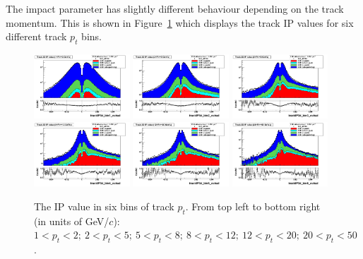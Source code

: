 The impact parameter has slightly different behaviour depending on the track momentum. This is shown in Figure~\ref{fig:IPbinnedTrackpt} which displays the track IP values for six different track $p_t$ bins.  




\begin{figure}[h!]
\centering
\includegraphics[width=0.32\textwidth]{figures/trackIP3d_bin1_cutsel_Log.png}
\includegraphics[width=0.32\textwidth]{figures/trackIP3d_bin2_cutsel_Log.png}
\includegraphics[width=0.32\textwidth]{figures/trackIP3d_bin3_cutsel_Log.png}
\includegraphics[width=0.32\textwidth]{figures/trackIP3d_bin4_cutsel_Log.png}
\includegraphics[width=0.32\textwidth]{figures/trackIP3d_bin5_cutsel_Log.png}
\includegraphics[width=0.32\textwidth]{figures/trackIP3d_bin6_cutsel_Log.png}
\caption{The IP value in six bins of track $p_t$. From top left to bottom right (in units of GeV/$c$): $1<p_t<2; \ 2<p_t<5; \ 5<p_t<8; \ 8<p_t<12; \ 12<p_t<20; \ 20<p_t<50$.   }
\label{fig:IPbinnedTrackpt}
\end{figure}

